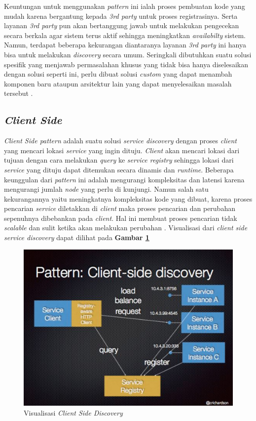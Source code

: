 Keuntungan untuk menggunakan \textit{pattern} ini ialah proses pembuatan kode yang mudah karena bergantung kepada \textit{3rd party} untuk proses registrasinya. Serta layanan \textit{3rd party} pun akan bertanggung jawab untuk melakukan pengecekan secara berkala agar sistem terus aktif sehingga meningkatkan \textit{availabilty} sistem. Namun, terdapat beberapa kekurangan diantaranya layanan \textit{3rd party} ini hanya bisa untuk melakukan \textit{discovery} secara umum. Seringkali dibutuhkan suatu solusi spesifik yang menjawab permasalahan khusus yang tidak bisa hanya diselesaikan dengan solusi seperti ini, perlu dibuat solusi \textit{custom} yang dapat menambah komponen baru ataupun arsitektur lain yang dapat menyelesaikan masalah tersebut \parencite{3rdpartyintegration}.

\subsection{\textit{Client Side}}
\textit{Client Side pattern} adalah suatu solusi \textit{service discovery} dengan proses \textit{client} yang mencari lokasi \textit{service} yang ingin dituju. \textit{Client} akan mencari lokasi dari tujuan dengan cara melakukan \textit{query} ke \textit{service registry} sehingga lokasi dari \textit{service} yang dituju dapat ditemukan secara dinamis dan \textit{runtime}. Beberapa keunggulan dari \textit{pattern} ini adalah mengurangi kompleksitas dan latensi karena mengurangi jumlah \textit{node} yang perlu di kunjungi. Namun salah satu kekurangannya yaitu meningkatnya kompleksitas kode yang dibuat, karena proses pencarian \textit{service} diletakkan di \textit{client} maka proses pencarian dan perubahan sepenuhnya dibebankan pada \textit{client}. Hal ini membuat proses pencarian tidak \textit{scalable} dan sulit ketika akan melakukan perubahan \parencite{clientsidediscovery}. Visualisasi dari \textit{client side service discovery} dapat dilihat pada \textbf{Gambar \ref{fig:client-side-discovery}}

\begin{figure}[ht]
  \centering
  \includegraphics[width=1\textwidth]{resources/chapter-2/client-side-discovery.jpg}
  \caption{Visualisasi \textit{Client Side Discovery} \parencite{clientsidediscovery} }
  \label{fig:client-side-discovery}
\end{figure}

